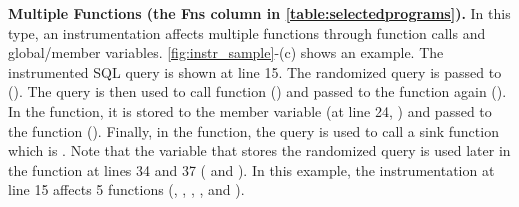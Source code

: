\noindent
{\bf Multiple Functions (the Fns column in \autoref{table:selectedprograms}).}
In this type, an instrumentation affects multiple functions through function calls and global/member variables. 
\autoref{fig:instr_sample}-(c) shows an example. 
The instrumented SQL query is shown at line 15. The randomized query is passed to  (). The query is then used to call  function () and passed to the function again (). In the  function, it is stored to the  member variable (at line 24, ) and passed to the  function (). Finally, in the  function, the query is used to call a sink function which is .
%
Note that the  variable that stores the randomized query is used later in the  function at lines 34 and 37 ( and ). 
%
In this example, the instrumentation at line 15 affects 5 functions (, , , , and ).




\vspace{-0.5em}
